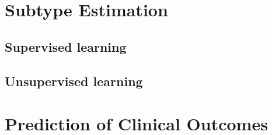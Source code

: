 \documentclass[../thesis.tex]{subfiles}
\begin{document}
\newpage

\section{Subtype Estimation}

\subsection{Supervised learning}

\subsection{Unsupervised learning}

\section{Prediction of Clinical Outcomes}
\end{document}
